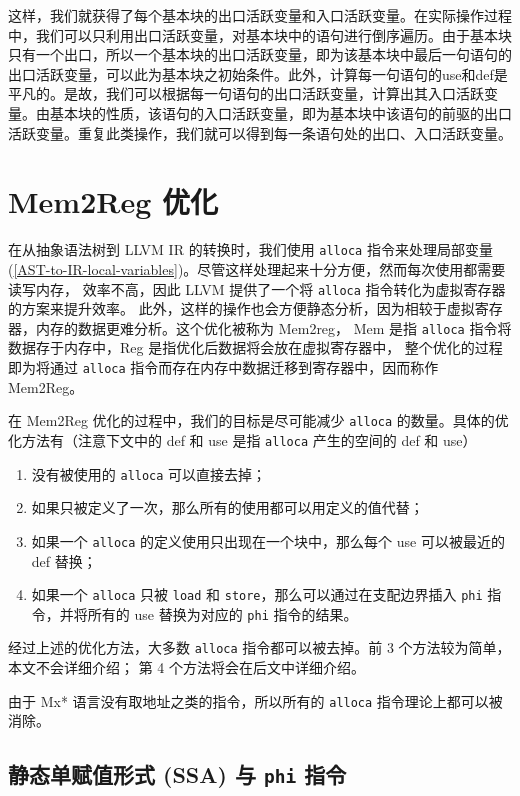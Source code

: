 这样，我们就获得了每个基本块的出口活跃变量和入口活跃变量。在实际操作过程中，我们可以只利用出口活跃变量，对基本块中的语句进行倒序遍历。由于基本块只有一个出口，所以一个基本块的出口活跃变量，即为该基本块中最后一句语句的出口活跃变量，可以此为基本块之初始条件。此外，计算每一句语句的use和def是平凡的。是故，我们可以根据每一句语句的出口活跃变量，计算出其入口活跃变量。由基本块的性质，该语句的入口活跃变量，即为基本块中该语句的前驱的出口活跃变量。重复此类操作，我们就可以得到每一条语句处的出口、入口活跃变量。

\section{Mem2Reg 优化}\label{mem2reg}

在从抽象语法树到 LLVM IR 的转换时，我们使用 \texttt{alloca} 指令来处理局部变量
(\ref{AST-to-IR-local-variables})。尽管这样处理起来十分方便，然而每次使用都需要读写内存，
效率不高，因此 LLVM 提供了一个将 \texttt{alloca} 指令转化为虚拟寄存器的方案来提升效率。
此外，这样的操作也会方便静态分析，因为相较于虚拟寄存器，内存的数据更难分析。这个优化被称为 Mem2reg，
Mem 是指 \texttt{alloca} 指令将数据存于内存中，Reg 是指优化后数据将会放在虚拟寄存器中，
整个优化的过程即为将通过 \texttt{alloca} 指令而存在内存中数据迁移到寄存器中，因而称作 Mem2Reg。

在 Mem2Reg 优化的过程中，我们的目标是尽可能减少 \texttt{alloca} 的数量。具体的优化方法有（注意下文中的 def 和
use 是指 \texttt{alloca} 产生的空间的 def 和 use）
\begin{enumerate}
    \item 没有被使用的 \texttt{alloca} 可以直接去掉；
    \item 如果只被定义了一次，那么所有的使用都可以用定义的值代替；
    \item 如果一个 \texttt{alloca} 的定义使用只出现在一个块中，那么每个 use 可以被最近的 def 替换；
    \item 如果一个 \texttt{alloca} 只被 \texttt{load} 和 \texttt{store}，那么可以通过在支配边界插入
        \texttt{phi} 指令，并将所有的 use 替换为对应的 \texttt{phi} 指令的结果。
\end{enumerate}
经过上述的优化方法，大多数 \texttt{alloca} 指令都可以被去掉。前 3 个方法较为简单，本文不会详细介绍；
第 4 个方法将会在后文中详细介绍。

由于 Mx* 语言没有取地址之类的指令，所以所有的 \texttt{alloca} 指令理论上都可以被消除。

\subsection{静态单赋值形式 (SSA) 与 \texttt{phi} 指令}

